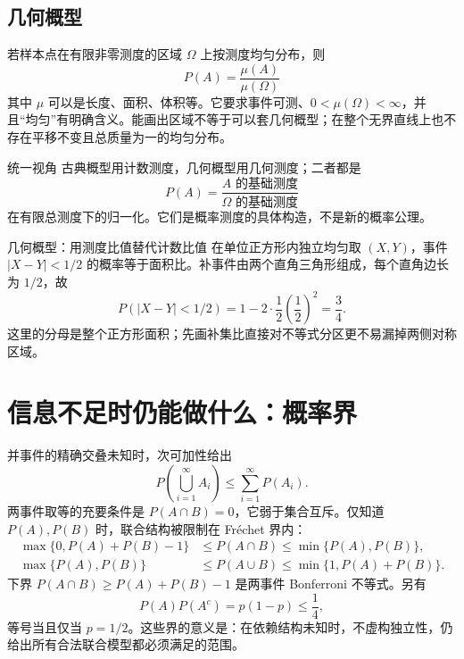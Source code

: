 \documentclass[11pt,a4paper]{ctexart}
\newenvironment{handbookdiagram}{\par\vspace{0.4em}\noindent\begin{center}}{\end{center}\vspace{0.4em}}
\begin{document}
\subsection{几何概型}

若样本点在有限非零测度的区域 $\Omega$ 上按测度均匀分布，则
\[
\boxed{P(A)=\frac{\mu(A)}{\mu(\Omega)}}
\]
其中 $\mu$ 可以是长度、面积、体积等。它要求事件可测、$0<\mu(\Omega)<\infty$，并且“均匀”有明确含义。能画出区域不等于可以套几何概型；在整个无界直线上也不存在平移不变且总质量为一的均匀分布。

\begin{handbookdiagram}
\resizebox{0.92\linewidth}{!}{%
%
}
\end{handbookdiagram}

\begin{corebox}{统一视角}
古典概型用计数测度，几何概型用几何测度；二者都是
\[
P(A)=\frac{\text{$A$ 的基础测度}}{\text{$\Omega$ 的基础测度}}
\]
在有限总测度下的归一化。它们是概率测度的具体构造，不是新的概率公理。
\end{corebox}

\begin{examplebox}{几何概型：用测度比值替代计数比值}
在单位正方形内独立均匀取 $(X,Y)$，事件 $\lvert X-Y\rvert<1/2$ 的概率等于面积比。补事件由两个直角三角形组成，每个直角边长为 $1/2$，故
\[
P(\lvert X-Y\rvert<1/2)=1-2\cdot\frac12\left(\frac12\right)^2=\frac34.
\]
这里的分母是整个正方形面积；先画补集比直接对不等式分区更不易漏掉两侧对称区域。
\end{examplebox}

\section{信息不足时仍能做什么：概率界}

并事件的精确交叠未知时，次可加性给出
\[
\boxed{P\!\left(\bigcup_{i=1}^{\infty}A_i\right)\le\sum_{i=1}^{\infty}P(A_i).}
\]
两事件取等的充要条件是 $P(A\cap B)=0$，它弱于集合互斥。仅知道 $P(A),P(B)$ 时，联合结构被限制在 Fr\'echet 界内：
\begin{align*}
\max\{0,P(A)+P(B)-1\}
&\le P(A\cap B)\le\min\{P(A),P(B)\},\\
\max\{P(A),P(B)\}
&\le P(A\cup B)\le\min\{1,P(A)+P(B)\}.
\end{align*}
下界 $P(A\cap B)\ge P(A)+P(B)-1$ 是两事件 Bonferroni 不等式。另有
\[
P(A)P(A^c)=p(1-p)\le\frac14,
\]
等号当且仅当 $p=1/2$。这些界的意义是：在依赖结构未知时，不虚构独立性，仍给出所有合法联合模型都必须满足的范围。
\end{document}
